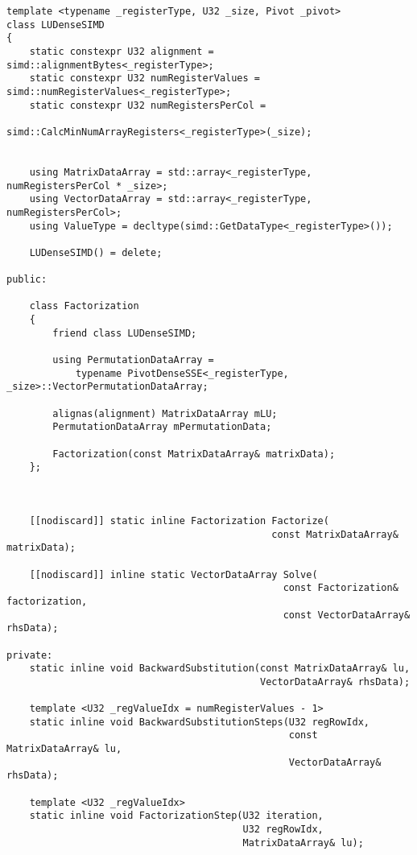 \begin{verbatim}
template <typename _registerType, U32 _size, Pivot _pivot>
class LUDenseSIMD
{
    static constexpr U32 alignment = simd::alignmentBytes<_registerType>;
    static constexpr U32 numRegisterValues = simd::numRegisterValues<_registerType>;
    static constexpr U32 numRegistersPerCol = 
                             simd::CalcMinNumArrayRegisters<_registerType>(_size);


    using MatrixDataArray = std::array<_registerType, numRegistersPerCol * _size>;
    using VectorDataArray = std::array<_registerType, numRegistersPerCol>;
    using ValueType = decltype(simd::GetDataType<_registerType>());

    LUDenseSIMD() = delete;

public:

    class Factorization
    {
        friend class LUDenseSIMD;

        using PermutationDataArray = 
            typename PivotDenseSSE<_registerType, _size>::VectorPermutationDataArray;

        alignas(alignment) MatrixDataArray mLU;
        PermutationDataArray mPermutationData;

        Factorization(const MatrixDataArray& matrixData);
    };



    [[nodiscard]] static inline Factorization Factorize(
                                              const MatrixDataArray& matrixData);

    [[nodiscard]] inline static VectorDataArray Solve(
                                                const Factorization& factorization,
                                                const VectorDataArray& rhsData);

private:
    static inline void BackwardSubstitution(const MatrixDataArray& lu, 
                                            VectorDataArray& rhsData);

    template <U32 _regValueIdx = numRegisterValues - 1>
    static inline void BackwardSubstitutionSteps(U32 regRowIdx, 
                                                 const MatrixDataArray& lu, 
                                                 VectorDataArray& rhsData);

    template <U32 _regValueIdx>
    static inline void FactorizationStep(U32 iteration, 
                                         U32 regRowIdx, 
                                         MatrixDataArray& lu);


\end{verbatim}
